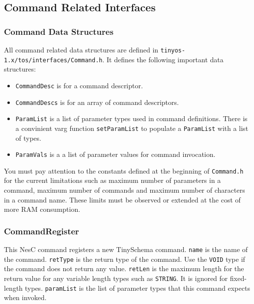 \documentclass[11pt]{article}
\newcommand{\docroot}{tinyos-1.x}
\begin{document}
\subsection{Command Related Interfaces}
\subsubsection{Command Data Structures}

All command related data structures are defined in
{\tt \docroot/tos/interfaces/Command.h}.
It defines the following important data structures:
\begin{itemize}
\item {\tt CommandDesc} is for a command descriptor.
\item {\tt CommandDescs} is for an array of command descriptors.
\item {\tt ParamList} is a list of parameter types used in command definitions.
There is a convinient varg function {\tt setParamList} to 
populate a {\tt ParamList} with a list of types.
\item {\tt ParamVals} is a a list of parameter values for command invocation.
\end{itemize}

You must pay attention to the constants defined at the beginning
of {\tt Command.h} for the current limitations such as maximum number of
parameters in a command, maximum number of commands and maximum number of
characters in a command name.  These limits must be observed or extended
at the cost of more RAM consumption.

\subsubsection{CommandRegister}


This NesC command registers a new TinySchema command.  {\tt name} is the
name of the command.  {\tt retType} is the return type of the command.
Use the {\tt VOID} type if the command does not return any value.
{\tt retLen} is the maximum length for the return value
for any variable length types such as {\tt STRING}.
It is ignored for fixed-length types.
{\tt paramList} is the list of parameter types that this
command expects when invoked.


\end{document}
